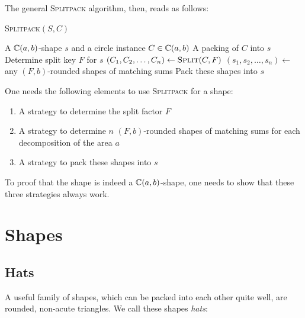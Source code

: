 \documentclass[%
    a4paper,              %
    style=screen,          %
    bibliography=totoc,   %
    nexus,                %
    lnum,                 %
    extramargin,          %
]{tubsbook}
\begin{document}
The general \textsc{Splitpack} algorithm, then, reads as follows:

\begin{algorithm}[htbp!]
    \caption{\textsc{Splitpack}$(S,C)$}
    \begin{algorithmic}
        \Require A $\mathbb{C}(a,b)$-shape $s$ and a circle instance $C \in \mathbb{C}(a,b)$
        \Ensure A packing of $C$ into $s$
        \State Determine split key $F$ for $s$
        \State $(C_1, C_2, \dots, C_n) \gets \textsc{Split}(C,F)$
        \State $(s_1, s_2, \dots, s_n) \gets$ any $(F,b)$-rounded shapes of matching sums
        \State Pack these shapes into $s$
            \State {}
        \EndFor
    \end{algorithmic}
\end{algorithm}

One needs the following elements to use \textsc{Splitpack} for a shape:

\begin{enumerate}
    \item A strategy to determine the split factor $F$
    \item A strategy to determine $n$ $(F,b)$-rounded shapes of matching sums for each decomposition of the area $a$
    \item A strategy to pack these shapes into $s$
\end{enumerate}

To proof that the shape is indeed a $\mathbb{C}(a,b)$-shape, one needs to show that these three strategies always work.



\chapter{Shapes}

\section{Hats}

A useful family of shapes, which can be packed into each other quite well, are rounded, non-acute triangles. We call these shapes \emph{hats}:
\end{document}
